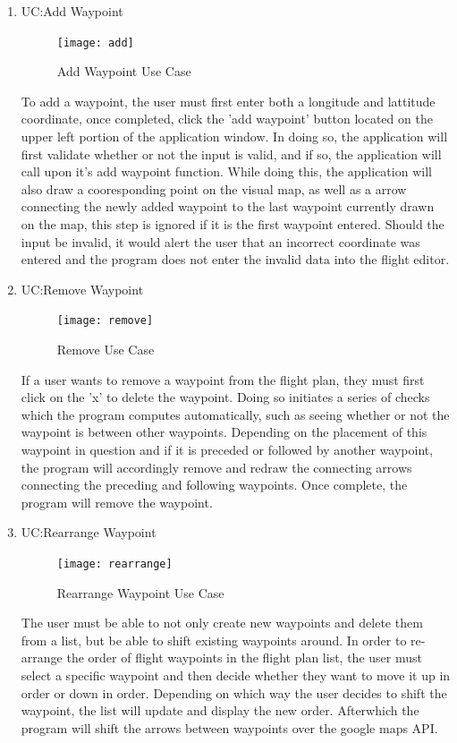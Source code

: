 \documentclass[12pt, letterpaper]{article}
\begin{document}
\begin{enumerate}
      \item UC:Add Waypoint
	\begin{figure}[!ht]
		\caption{Add Waypoint Use Case}
    		\centering
    		\texttt{[image: add]}
	\end{figure}
	To add a waypoint, the user must first enter both a longitude and lattitude coordinate, once completed, click the 'add waypoint' button located on the upper left portion of the application window. 		In doing so, the application will first validate whether or not the input is valid, and if so, the application will call upon it's add waypoint function. While doing this, the application will 		also draw a cooresponding point on the visual map, as well as a arrow connecting the newly added waypoint to the last waypoint currently drawn on the map, this step is ignored if it is the first 		waypoint entered. Should the input be invalid, it would alert the user that an incorrect coordinate was entered and the program does not enter the invalid data into the flight editor.

      \item UC:Remove Waypoint
	\begin{figure}[!ht]
		\caption{Remove Use Case}
    		\centering
    		\texttt{[image: remove]}
	\end{figure}
	If a user wants to remove a waypoint from the flight plan, they must first click on the 'x' to delete the waypoint. Doing so initiates a series of checks which the program computes automatically, such as seeing whether or not the waypoint is between other waypoints. Depending on the placement of this waypoint in question and if it is preceded or followed by another waypoint, the program will accordingly remove and redraw the connecting arrows connecting the preceding and following waypoints. Once complete, the program will remove the waypoint.

      \item UC:Rearrange Waypoint
	\begin{figure}[!ht]
    		\centering
		\caption{Rearrange Waypoint Use Case}
    		\texttt{[image: rearrange]}
	\end{figure}
	The user must be able to not only create new waypoints and delete them from a list, but be able to shift existing waypoints around. In order to re-arrange the order of flight waypoints in the flight plan list, the user must select a specific waypoint and then decide whether they want to move it up in order or down in order. Depending on which way the user decides to shift the waypoint, the list will update and display the new order. Afterwhich the program will shift the arrows between waypoints over the google maps API. 


\end{enumerate}
\end{document}

